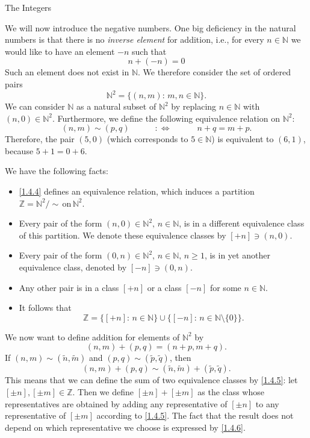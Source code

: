 \documentclass[smaller,hyperref={CJKbookmarks=true}]{beamer}
\newcommand{\N}{\mathbb{N}} \newcommand{\Z}{\mathbb{Z}} \newcommand{\Q}{\mathbb{Q}}
\begin{document}
\begin{frame}{The Integers}
\begin{spacing}{1}
We will now introduce the negative numbers. One big deficiency in the
natural numbers is that there is no \emph{inverse element} for addition, i.e., for every $n\in\N$ we would like to have an element $-n$ such that
\[n+(-n)=0\]
Such an element does not exist in $\N$. We therefore consider the set of ordered pairs
\[\N^2=\{(n,m)\!:\,m,n\in\N\}.\]
We can consider $\N$ as a natural subset of $\N^2$ by replacing $n\in\N$ with $(n,0)\in\N^2$. Furthermore, we define the following equivalence relation on $\N^2$:
\begin{equation}\label{1.4.4}
  (n,m)\sim(p,q)\qquad\quad:\Leftrightarrow\qquad\quad
  n+q=m+p.
\end{equation}
Therefore, the pair $(5,0)$ (which corresponds to $5\in\N$) is equivalent to $(6,1)$, because $5+1=0+6$.
\end{spacing}
\newpage
\begin{spacing}{1.15}
\vspace*{8pt}
We have the following facts:
\begin{itemize}
  \item \eqref{1.4.4} defines an equivalence relation, which induces a partition $\Z=\N^2/\sim\,\text{on}\,\N^2$.
  \item Every pair of the form $(n,0)\in\N^2,\,n\in\N$, is in a different equivalence class of this partition. We denote these equivalence classes by $[+n]\ni(n,0)$.
  \item Every pair of the form $(0,n)\in\N^2,\,n\in\N,\,n\geq1$, is in yet another equivalence class, denoted by $[-n]\ni(0,n)$.
  \item Any other pair is in a class $[+n]$ or a class $[-n]$ for some $n\in\N$.
  \item It follows that
  \[\Z=\{[+n]\!:\,n\in\N\}\cup\{[-n]\!:\,n\in\N\setminus\{0\}\}.\]
\end{itemize}
\newpage
We now want to define addition for elements of $\N^2$ by
\begin{equation}\label{1.4.5}
  (n,m)+(p,q)=(n+p,m+q).
\end{equation}
If $(n,m)\sim(\widetilde{n},\widetilde{m})$ and $(p,q)\sim(\widetilde{p},\widetilde{q})$, then
\begin{equation}\label{1.4.6}
(n,m)+(p,q)\sim(\widetilde{n},\widetilde{m})+(\widetilde{p},\widetilde{q}).
\end{equation}
This means that we can define the sum of two equivalence classes by \eqref{1.4.5}: let $[\pm n],[\pm m]\in\Z$. Then we define $[\pm n]+[\pm m]$ as the class whose representatives are obtained by adding any representative of $[\pm n]$ to any representative of $[\pm m]$ according to \eqref{1.4.5}. The fact that the result does not depend on which representative we choose is expressed by \eqref{1.4.6}.\\[5pt]

\end{spacing}
\end{frame}
\end{document}
